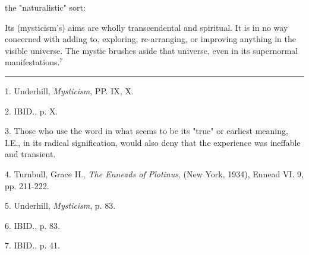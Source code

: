 the "naturalistic" sort:\par
\begin{center}
	\parbox{0.8\textwidth}{
		\hspace*{5mm}Its (mysticism's) aims are wholly transcendental and
		spiritual. It is in no way concerned with adding to, exploring,
		re-arranging, or improving anything in the visible
		universe. The mystic brushes aside that universe, even in
		its supernormal manifestations.$^{7}$\par
	}%
\end{center}
\vspace*{\fill}
\noindent\rule{0.25\textwidth}{0.4pt}\par
1. Underhill, \textit{Mysticism}, PP. IX, X.\par
2. IBID., p. X.\par
3. Those who use the word in what seems to be its "true" or
earliest meaning, I.E., in its radical signification,
would also deny that the experience was ineffable and transient.\par
4. Turnbull, Grace H., \textit{The Enneads of Plotinus}, (New York, 1934),
Ennead VI. 9, pp. 211-222.\par
5. Underhill, \textit{Mysticism}, p. 83.\par
6. IBID., p. 83.\par
7. IBID., p. 41.\par

\newpage

